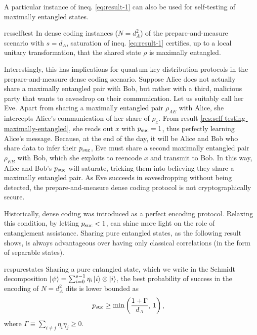         A particular instance of ineq. \ref{eq:result-1} can also be used for self-testing of maximally entangled states.
        \begin{restatable}{res}{selftest}
            In dense coding instances ($N=d_A^2$) of the prepare-and-measure scenario with $s=d_A$, saturation of ineq. \ref{eq:result-1} certifies, up to a local unitary transformation, that the shared state $\rho$ is maximally entangled.
            \label{res:self-testing-maximally-entangled}
        \end{restatable}
        
        Interestingly, this has implications for quantum key distribution protocols in the prepare-and-measure dense coding scenario. Suppose Alice does not actually share a maximally entangled pair with Bob, but rather with a third, malicious party that wants to eavesdrop on their communication. Let us suitably call her Eve. Apart from sharing a maximally entangled pair $\rho_{AE}$ with Alice, she intercepts Alice's communication of her share of $\rho_x$. From result \ref{res:self-testing-maximally-entangled}, she reads out $x$ with $p_{\text{suc}} = 1$, thus perfectly learning Alice's message. Because, at the end of the day, it will be Alice and Bob who share data to infer their $p_{\text{suc}}$, Eve must share a second maximally entangled pair $\rho_{EB}$ with Bob, which she exploits to reencode $x$ and transmit to Bob. In this way, Alice and Bob's $p_{\text{suc}}$ will saturate, tricking them into believing they share a maximally entangled pair. As Eve succeeds in eavesdropping without being detected, the prepare-and-measure dense coding protocol is not cryptographically secure.
        
        Historically, dense coding was introduced as a perfect encoding protocol. Relaxing this condition, by letting $p_{\text{suc}} < 1$, can shine more light on the role of entanglement assistance. Sharing pure entangled states, as the following result shows, is always advantageous over having only classical correlations (in the form of separable states).
        \begin{restatable}{res}{purestates}
            Sharing a pure entangled state, which we write in the Schmidt decomposition $\ket{\psi} = \sum_{i = 0}^{s-1} \eta_i \ket{i} \otimes \ket{i}$, the best probability of success in the encoding of $N = d_A^2$ dits is lower bounded as
            $$
                p_{\text{suc}} \geq \min \left( \frac{1 + \Gamma}{d_A}, \,1 \right),
            $$
            where $\Gamma \equiv \sum_{i \neq j} \eta_i \eta_j \geq 0$.
        \label{res:pure-states-advantage}
        \end{restatable}
        
